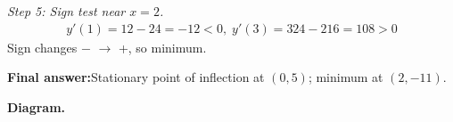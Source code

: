 \documentclass[11pt]{article}
\begin{document}
\textit{Step 5: Sign test near \( x = 2 \).}
\[\begin{gathered}
y'(1) = 12 - 24 = -12 < 0,\; y'(3) = 324 - 216 = 108 > 0
\end{gathered}\]
Sign changes $-$ $\to$ +, so minimum.

\begin{answerbox}
\textbf{Final answer:}\quad Stationary point of inflection at \(\displaystyle  (0, 5) \); minimum at \(\displaystyle  (2, -11) \).
\end{answerbox}
\textbf{Diagram.}

\begin{center}
\end{center}
\end{document}
